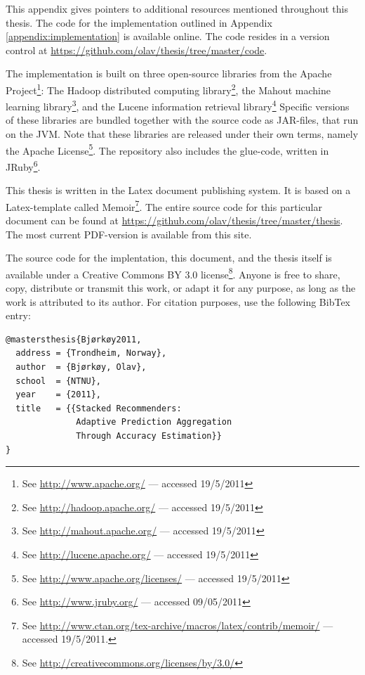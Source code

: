 This appendix gives pointers to additional resources mentioned throughout this thesis.
The code for the implementation outlined in Appendix \ref{appendix:implementation} is available online.
The code resides in a version control at 
\url{https://github.com/olav/thesis/tree/master/code}.

The implementation is built on three open-source libraries from the
Apache Project\footnote{See \url{http://www.apache.org/} --- accessed 19/5/2011}:
The Hadoop distributed computing library\footnote{See \url{http://hadoop.apache.org/} --- accessed 19/5/2011},
the Mahout machine learning library\footnote{See \url{http://mahout.apache.org/} --- accessed 19/5/2011},
and the Lucene information retrieval library\footnote{See \url{http://lucene.apache.org/} --- accessed 19/5/2011}
Specific versions of these libraries are bundled together with
the source code as JAR-files, that run on the JVM.
Note that these libraries are released under their own terms,
namely the Apache License\footnote{
See \url{http://www.apache.org/licenses/} --- accessed 19/5/2011}.
The repository also includes the glue-code, written in JRuby\footnote{
See \url{http://www.jruby.org/} --- accessed 09/05/2011}.

This thesis is written in the Latex document publishing system.
It is based on a Latex-template called Memoir\footnote{
See \url{http://www.ctan.org/tex-archive/macros/latex/contrib/memoir/} --- accessed 19/5/2011.}.
The entire source code for this particular document can be found at 
\url{https://github.com/olav/thesis/tree/master/thesis}.
The most current PDF-version is available from this site.

The source code for the implentation, this document, and the thesis itself
is available under a Creative Commons BY 3.0 license\footnote{
See \url{http://creativecommons.org/licenses/by/3.0/}}.
Anyone is free to share, copy, distribute or transmit this work,
or adapt it for any purpose,
as long as the work is attributed to its author.
For citation purposes, use the following BibTex entry:

{
\footnotesize
\begin{verbatim}
@mastersthesis{Bjørkøy2011,
  address = {Trondheim, Norway},
  author  = {Bjørkøy, Olav},
  school  = {NTNU},
  year    = {2011},
  title   = {{Stacked Recommenders: 
              Adaptive Prediction Aggregation
              Through Accuracy Estimation}}
} 
\end{verbatim}
}

